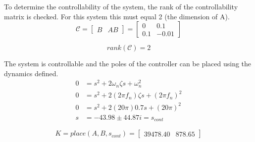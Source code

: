 \documentclass[11pt]{article}
\begin{document}
\begin{enumerate}[label=\textbf{\arabic*.}]
  To determine the controllability of the system, the rank of the controllability 
  matrix is checked. For this system this must equal 2 (the dimension of A).
  \begin{equation}
    \mathcal{C} = 
    \begin{bmatrix}
      B & AB
    \end{bmatrix}
    =
    \begin{bmatrix}
      0 & 0.1 \\ 0.1 & -0.01
    \end{bmatrix}
  \end{equation}

  \begin{equation}
    rank(\mathcal{C}) = 2
  \end{equation}

  The system is controllable and the poles of the controller can be placed using the 
  dynamics defined.
  \begin{equation}
    \begin{split}
      0 &= s^2 + 2 \omega_n \zeta s + \omega_n^2 \\
      0 &= s^2 + 2 (2 \pi f_n) \zeta s + (2 \pi f_n)^2 \\
      0 &= s^2 + 2 (20 \pi) 0.7 s + (20 \pi)^2 \\
      s &= -43.98 \pm 44.87i = s_{cont}
    \end{split}
  \end{equation}

  \begin{equation}
    K = place(A, B, s_{cont}) =
    \begin{bmatrix}
      39478.40 & 878.65
    \end{bmatrix}
  \end{equation}


\end{enumerate}
\end{document}
